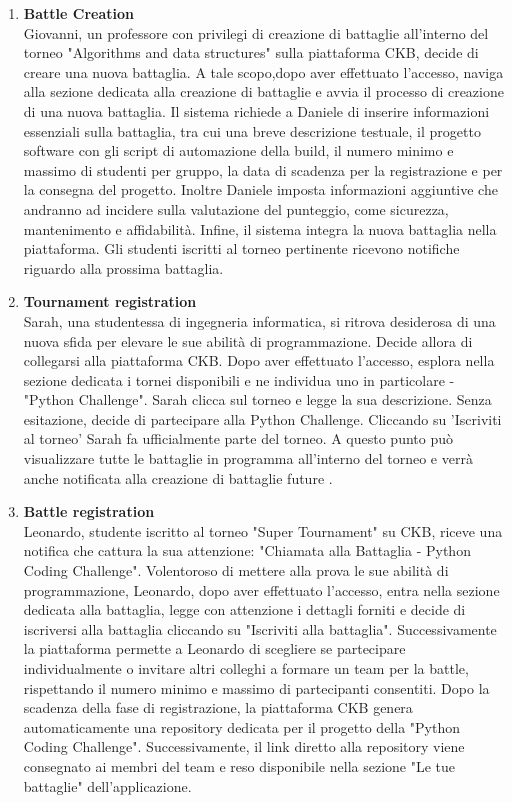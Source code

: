 \begin{enumerate}[label=\textbf{\Alph*}.]
\item \textbf{Battle Creation} \\ 
Giovanni, un professore  con privilegi di creazione di battaglie all'interno del torneo "Algorithms and data structures" sulla piattaforma CKB, decide di creare una nuova battaglia. A tale scopo,dopo aver effettuato l'accesso, naviga alla sezione dedicata alla creazione di battaglie e avvia il processo di creazione di una nuova battaglia. Il sistema richiede a Daniele di inserire informazioni essenziali sulla battaglia, tra cui una breve descrizione testuale, il progetto software con gli script di automazione della build, il numero minimo e massimo di studenti per gruppo, la data di scadenza per la registrazione e per la consegna del progetto.
Inoltre Daniele imposta informazioni aggiuntive che andranno ad incidere sulla valutazione del punteggio, come sicurezza, mantenimento e affidabilità. Infine, il sistema integra la nuova battaglia nella piattaforma. Gli studenti iscritti al torneo pertinente ricevono notifiche riguardo alla prossima battaglia.
\item \textbf{Tournament registration} \\
Sarah, una studentessa  di ingegneria informatica, si ritrova desiderosa di una nuova sfida per elevare le sue abilità di programmazione. Decide allora di collegarsi alla piattaforma CKB. Dopo aver effettuato l'accesso, esplora nella sezione dedicata i tornei disponibili e ne individua uno in particolare - "Python  Challenge". Sarah clicca sul torneo e legge la sua descrizione. Senza esitazione, decide di partecipare alla Python Challenge. Cliccando su 'Iscriviti al torneo' Sarah fa ufficialmente parte del torneo. A questo punto può visualizzare tutte le battaglie in programma all'interno del torneo e verrà anche notificata alla creazione di battaglie future
.
\item \textbf{Battle registration} \\
Leonardo, studente iscritto al torneo "Super Tournament" su CKB, riceve una notifica che cattura la sua attenzione: "Chiamata alla Battaglia - Python Coding Challenge". Volentoroso di mettere alla prova le sue abilità di programmazione, Leonardo, dopo aver effettuato l'accesso, entra nella sezione dedicata alla battaglia, legge con attenzione i dettagli forniti e decide di iscriversi alla battaglia cliccando su "Iscriviti alla battaglia". Successivamente la piattaforma permette a Leonardo di scegliere se partecipare individualmente o invitare altri colleghi a formare un team per la battle, rispettando il numero minimo e massimo di partecipanti consentiti. Dopo la scadenza della fase di registrazione, la piattaforma CKB genera automaticamente una repository dedicata per il progetto della "Python Coding Challenge". Successivamente, il link diretto alla repository viene consegnato ai membri del team e reso disponibile nella sezione "Le tue battaglie" dell'applicazione.

\end{enumerate}
